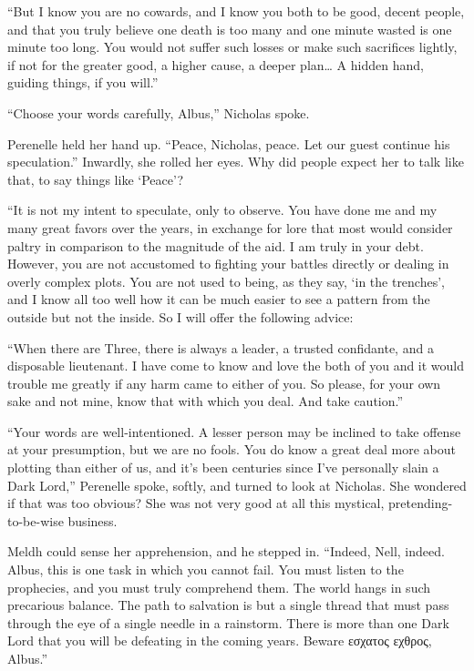 “But I know you are no cowards, and I know you both to be good, decent people, and that you truly believe one death is too many and one minute wasted is one minute too long. You would not suffer such losses or make such sacrifices lightly, if not for the greater good, a higher cause, a deeper plan… A hidden hand, guiding things, if you will.”

“Choose your words carefully, Albus,” Nicholas spoke.

Perenelle held her hand up. “Peace, Nicholas, peace. Let our guest continue his speculation.” Inwardly, she rolled her eyes. Why did people expect her to talk like that, to say things like ‘Peace’?

“It is not my intent to speculate, only to observe. You have done me and my many great favors over the years, in exchange for lore that most would consider paltry in comparison to the magnitude of the aid. I am truly in your debt. However, you are not accustomed to fighting your battles directly or dealing in overly complex plots. You are not used to being, as they say, ‘in the trenches’, and I know all too well how it can be much easier to see a pattern from the outside but not the inside. So I will offer the following advice:

“When there are Three, there is always a leader, a trusted confidante, and a disposable lieutenant. I have come to know and love the both of you and it would trouble me greatly if any harm came to either of you. So please, for your own sake and not mine, know that with which you deal. And take caution.”

“Your words are well-intentioned. A lesser person may be inclined to take offense at your presumption, but we are no fools. You do know a great deal more about plotting than either of us, and it’s been centuries since I’ve personally slain a Dark Lord,” Perenelle spoke, softly, and turned to look at Nicholas. She wondered if that was too obvious? She was not very good at all this mystical, pretending-to-be-wise business.

Meldh could sense her apprehension, and he stepped in. “Indeed, Nell, indeed. Albus, this is one task in which you cannot fail. You must listen to the prophecies, and you must truly comprehend them. The world hangs in such precarious balance. The path to salvation is but a single thread that must pass through the eye of a single needle in a rainstorm. There is more than one Dark Lord that you will be defeating in the coming years. Beware εσχατος εχθρος, Albus.”
\simpleline

